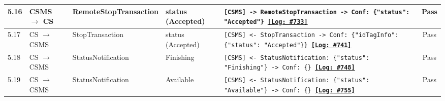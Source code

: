 \documentclass[10pt, a4paper, landscape]{article}
\begin{document}
\begin{longtable}{|p{1.0cm}|p{2.5cm}|p{4.0cm}|p{5.0cm}|p{10.0cm}|c|}
\hline
5.16 & CSMS $\to$ CS & RemoteStopTransaction & status (Accepted) & \footnotesize\texttt{[CSMS] -> RemoteStopTransaction \newline [CS] -> Conf: \{"status": "Accepted"\} \newline \hyperref[log:5.16]{\textbf{[Log: \#733]}}} & Pass \\
\hline
5.17 & CS $\to$ CSMS & StopTransaction & status (Accepted) & \footnotesize\texttt{[CSMS] <- StopTransaction \newline [CSMS] -> Conf: \{"idTagInfo": \{"status": "Accepted"\}\} \newline \hyperref[log:5.17]{\textbf{[Log: \#741]}}} & Pass \\
\hline
5.18 & CS $\to$ CSMS & StatusNotification & Finishing & \footnotesize\texttt{[CSMS] <- StatusNotification: \{"status": "Finishing"\} \newline [CSMS] -> Conf: \{\} \newline \hyperref[log:5.18]{\textbf{[Log: \#748]}}} & Pass \\
\hline
5.19 & CS $\to$ CSMS & StatusNotification & Available & \footnotesize\texttt{[CSMS] <- StatusNotification: \{"status": "Available"\} \newline [CSMS] -> Conf: \{\} \newline \hyperref[log:5.19]{\textbf{[Log: \#755]}}} & Pass \\
\hline


\end{longtable}
\end{document}
